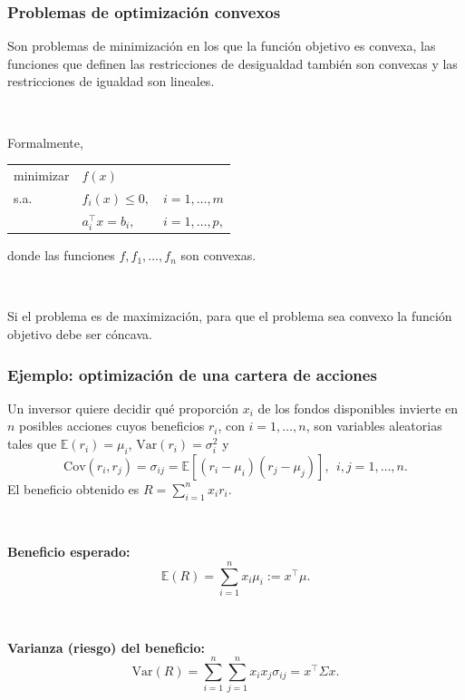 \documentclass{beamer}
\begin{document}
\begin{frame}
\frametitle{Problemas de optimización convexos}


Son problemas de minimización en los que la función objetivo es convexa, las funciones que definen las restricciones de desigualdad también son convexas y las restricciones de igualdad son lineales. 

\

Formalmente,
\begin{center}
\begin{tabular}{lll}
minimizar & $f(x)$ & \\
s.a. & $f_i(x)\leq 0,$  &  $i=1,\ldots,m$ \\
	 & $a^\top_i x = b_i,$  &  $i=1,\ldots,p$,
\end{tabular}
\end{center}
donde las funciones $f,f_1,\ldots, f_n$ son convexas.

\


Si el problema es de maximización, para que el problema sea convexo la función objetivo debe ser cóncava.

\end{frame}
\begin{frame}
\frametitle{Ejemplo: optimización de una cartera de acciones}

Un inversor quiere decidir qué proporción  $x_i$ de los fondos disponibles invierte
en $n$ posibles acciones cuyos beneficios $r_i$, con $i=1,\ldots,n$, son variables aleatorias tales que $\mathbb{E}(r_i)=\mu_i$, $\mbox{Var}(r_i)=\sigma^2_i$ y 
\[
\mbox{Cov}(r_i,r_j) = \sigma_{ij} = \mathbb{E}[(r_i-\mu_i)(r_j-\mu_j)], \ \ i,j=1,\ldots, n.
\]
El beneficio obtenido es $R=\sum_{i=1}^n x_ir_i$.


\

\textbf{Beneficio esperado:} 
\[
\mathbb{E}(R)=\sum_{i=1}^n x_i\mu_i := x^\top \mu.
\]

\

\textbf{Varianza (riesgo) del beneficio:}
\[
\mbox{Var}(R) = \sum_{i=1}^n \sum_{j=1}^n x_ix_j\sigma_{ij} = x^\top\Sigma x.
\]
  
\end{frame}
\end{document}
